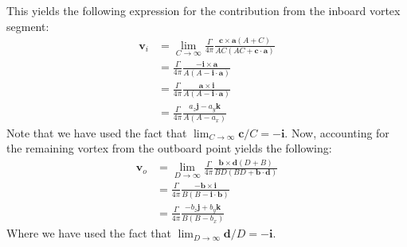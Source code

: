 \documentclass[12pt]{article}
\newcommand{\f}{\frac}
\newcommand{\mb}{\mathbf}
\begin{document}
This yields the following expression for the contribution from the
inboard vortex segment:
%
\begin{equation*}
  \begin{aligned}
    \mb{v}_{i} & = \lim_{C \rightarrow \infty} \f{\Gamma}{4\pi} \f{\mb{c} \times \mb{a}(A + C)}{AC(AC + \mb{c}\cdot \mb{a})} \\
    & = \f{\Gamma}{4\pi} \f{-\mb{i} \times \mb{a}}{A(A - \mb{i}\cdot \mb{a})} \\
    & = \f{\Gamma}{4\pi} \f{\mb{a} \times \mb{i}}{A(A - \mb{i}\cdot \mb{a})} \\
    & = \f{\Gamma}{4\pi} \f{a_{z} \mb{j} - a_{y}\mb{k}}{A(A - a_x)}
  \end{aligned}
\end{equation*}
Note that we have used the fact that $\lim_{C \rightarrow \infty}
\mb{c}/C = -\mb{i}$.  Now, accounting for the remaining vortex from
the outboard point yields the following:
\begin{equation*}
  \begin{aligned}
    \mb{v}_{o} & = \lim_{D \rightarrow \infty}\f{\Gamma}{4\pi} \f{ \mb{b} \times \mb{d}(D + B)}{BD(BD + \mb{b}\cdot \mb{d})} \\
    & = \f{\Gamma}{4\pi} \f{-\mb{b} \times \mb{i}}{B(B - \mb{i}\cdot \mb{b})} \\
    & = \f{\Gamma}{4\pi} \f{-b_{z} \mb{j} + b_{y} \mb{k}}{B(B - b_x)}
  \end{aligned}
\end{equation*}
Where we have used the fact that $\lim_{D \rightarrow \infty} \mb{d}/D
= -\mb{i}$.
\end{document}
